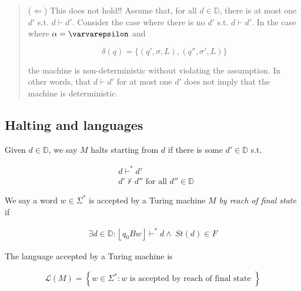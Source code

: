\documentclass[a4paper, 12pt]{article}
\begin{document}
\begin{quote}
($\Leftarrow$) This does not hold!! Assume that, for all $d \in \mathbb{D}$,
there is at most one $d'$ s.t. $d \vdash d'$. 
 Consider the case where there is no $d'$ s.t. $d \vdash d'$. In the case where
 $\alpha = \varvarepsilon$ and

$$
\delta(q) = \{ (q', \sigma, L), (q'', \sigma', L) \}
$$

the machine is non-deterministic without violating the assumption. In other
words, that $d \vdash d'$ for at most one $d'$ does not imply that the machine
is deterministic.

\end{quote}
\normalsize


\subsection{Halting and languages}

Given $d \in \mathbb{D}$, we say $M$ halts starting from $d$ if there is some
$d' \in \mathbb{D}$ s.t. 

\begin{align*}
    &d \vdash^* d' \\ 
    &d' \not\vdash d'' \text{ for all } d'' \in \mathbb{D}
\end{align*}

We say a word $w \in \Sigma^{*}$ is accepted by a Turing machine $M$ \textit{by reach of final
state} if

\begin{align*}
    \exists d \in \mathbb{D} : \left\lfloor q_0 B w \right\rfloor \vdash^* d \land ~ St(d) \in F
\end{align*}

The language accepted by a Turing machine is 

\begin{align*}
    \mathcal{L}(M) = \left\{w \in \Sigma^{*}:  w \text{ is accepted by reach of final state } \right\} 
\end{align*}
\end{document}
